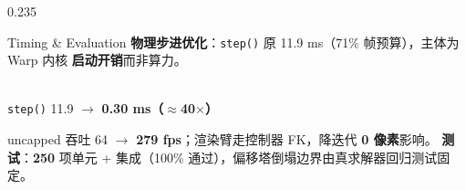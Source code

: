 \documentclass[final]{beamer}
\newcommand{\hl}[1]{{\bfseries\color{hred}#1}}      %
\newcommand{\sub}[1]{{\bfseries #1}}                 %
\begin{document}
\begin{frame}[t]{}
\begin{columns}[t]
\begin{column}{0.235\linewidth}
\begin{panel}{Timing \& Evaluation}
\normalsize
\sub{物理步进优化}：\texttt{step()} 原 11.9 ms（71\% 帧预算），主体为 Warp 内核
\sub{启动开销}而非算力。
\vspace{4pt}
\begin{center}
\\[2pt]
{\footnotesize \texttt{step()} 11.9 $\to$ \hl{0.30 ms（$\approx$40$\times$）}}
\end{center}
\vspace{2pt}
uncapped 吞吐 64 $\to$ \hl{279 fps}；渲染臂走控制器 FK，降迭代 \sub{0 像素}影响。
\vfill
\sub{测试}：\hl{250} 项单元 + 集成（100\% 通过），偏移塔倒塌边界由真求解器回归测试固定。
\end{panel}
\end{column}

\end{columns}

\end{frame}
\end{document}
